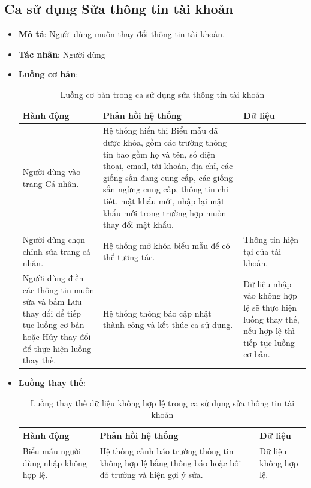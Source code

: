 \documentclass[./../main.tex]{subfiles}
\begin{document}
\subsection{Ca sử dụng Sửa thông tin tài khoản}
\begin{itemize}
    \item \textbf{Mô tả}: Người dùng muốn thay đổi thông tin tài khoản.
    \item \textbf{Tác nhân}: Người dùng
    \item \textbf{Luồng cơ bản}:
    \begin{table}[H]
    \caption{\label{uc-11}Luồng cơ bản trong ca sử dụng sửa thông tin tài khoản}
    \begin{tabularx}{\textwidth}{| X | X | X |}
        \hline
        \textbf{Hành động} & \textbf{Phản hồi hệ thống} & \textbf{Dữ liệu} \\ \hline
        Người dùng vào trang Cá nhân. & Hệ thống hiển thị Biểu mẫu đã được khóa, gồm các trường thông tin bao gồm họ và tên, số điện thoại, email, tài khoản, địa chỉ, các giống sắn đang cung cấp, các giống sắn ngừng cung cấp, thông tin chi tiết, mật khẩu mới, nhập lại mật khẩu mới trong trường hợp muốn thay đổi mật khẩu. &
        \\ \hline
        Người dùng chọn chỉnh sửa trang cá nhân. & Hệ thống mở khóa biểu mẫu để có thể tương tác. & Thông tin hiện tại của tài khoản.
        \\ \hline
        Người dùng điền các thông tin muốn sửa và bấm Lưu thay đổi để tiếp tục luồng cơ bản hoặc Hủy thay đổi để thực hiện luồng thay thế. & Hệ thống thông báo cập nhật thành công và kết thúc ca sử dụng. & Dữ liệu nhập vào không hợp lệ sẽ thực hiện luồng thay thế, nếu hợp lệ thì tiếp tục luồng cơ bản.
        \\ \hline
    \end{tabularx}
    \end{table}    
    \item \textbf{Luồng thay thế}:
        \begin{table}[H]
        \caption{\label{uc-12}Luồng thay thế dữ liệu không hợp lệ trong ca sử dụng sửa thông tin tài khoản}
        \begin{tabularx}{\textwidth}{| X | X | X |}
            \hline
            \textbf{Hành động} & \textbf{Phản hồi hệ thống} & \textbf{Dữ liệu} \\ \hline
            Biểu mẫu người dùng nhập không hợp lệ. & Hệ thống cảnh báo trường thông tin không hợp lệ bằng thông báo hoặc bôi đỏ trường và hiện gợi ý sửa. & Dữ liệu không hợp lệ.

\end{tabularx}
\end{table}
\end{itemize}
\end{document}
